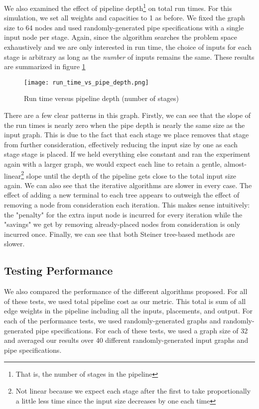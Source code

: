 \documentclass{acmart}
\begin{document}
	We also examined the effect of pipeline depth\footnote{That is, the number of stages in the pipeline} on total run times. For this simulation, we set all weights and capacities to 1 as before. We fixed the graph size to 64 nodes and used randomly-generated pipe specifications with a single input node per stage. Again, since the algorithm searches the problem space exhaustively and we are only interested in run time, the choice of inputs for each stage is arbitrary as long as the \textit{number} of inputs remains the same. These results are summarized in figure \ref{fig:pd_gs}
	\begin{figure}[H]
	    \centering
	    \texttt{[image: run\_time\_vs\_pipe\_depth.png]}
	    \caption{Run time versus pipeline depth (number of stages)}
	    \label{fig:pd_gs}
	\end{figure}
	There are a few clear patterns in this graph. Firstly, we can see that the slope of the run times is nearly zero when the pipe depth is nearly the same size as the input graph. This is due to the fact that each stage we place removes that stage from further consideration, effectively reducing the input size by one as each stage stage is placed. If we held everything else constant and ran the experiment again with a larger graph, we would expect each line to retain a gentle, almost-linear\footnote{Not linear because we expect each stage after the first to take proportionally a little less time since the input size decreases by one each time} slope until the depth of the pipeline gets close to the total input size again.
	We can also see that the iterative algorithms are slower in every case. The effect of adding a new terminal to each tree appears to outweigh the effect of removing a node from consideration each iteration. This makes sense intuitively: the "penalty" for the extra input node is incurred for every iteration while the "savings" we get by removing already-placed nodes from consideration is only incurred once. Finally, we can see that both Steiner tree-based methods are slower.
	
	\subsection{Testing Performance}
	We also compared the performance of the different algorithms proposed. For all of these tests, we used total pipeline cost as our metric. This total is sum of all edge weights in the pipeline including all the inputs, placements, and output. For each of the performance tests, we used randomly-generated graphs and randomly-generated pipe specifications. For each of these tests, we used a graph size of 32 and averaged our results over 40 different randomly-generated input graphs and pipe specifications.
	
\end{document}
